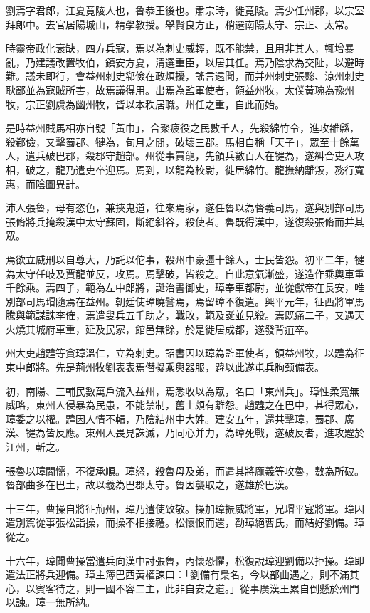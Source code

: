 
\begin{pinyinscope}
劉焉字君郎，江夏竟陵人也，魯恭王後也。肅宗時，徙竟陵。焉少任州郡，以宗室拜郎中。去官居陽城山，精學教授。舉賢良方正，稍遷南陽太守、宗正、太常。

時靈帝政化衰缺，四方兵寇，焉以為刺史威輕，既不能禁，且用非其人，輒增暴亂，乃建議改置牧伯，鎮安方夏，清選重臣，以居其任。焉乃陰求為交阯，以避時難。議未即行，會益州刺史郗儉在政煩擾，謠言遠聞，而并州刺史張懿、涼州刺史耿鄙並為寇賊所害，故焉議得用。出焉為監軍使者，領益州牧，太僕黃琬為豫州牧，宗正劉虞為幽州牧，皆以本秩居職。州任之重，自此而始。

是時益州賊馬相亦自號「黃巾」，合聚疲役之民數千人，先殺綿竹令，進攻雒縣，殺郗儉，又擊蜀郡、犍為，旬月之閒，破壞三郡。馬相自稱「天子」，眾至十餘萬人，遣兵破巴郡，殺郡守趙部。州從事賈龍，先領兵數百人在犍為，遂糾合吏人攻相，破之，龍乃遣吏卒迎焉。焉到，以龍為校尉，徙居綿竹。龍撫納離叛，務行寬惠，而陰圖異計。

沛人張魯，母有恣色，兼挾鬼道，往來焉家，遂任魯以為督義司馬，遂與別部司馬張脩將兵掩殺漢中太守蘇固，斷絕斜谷，殺使者。魯既得漢中，遂復殺張脩而并其眾。

焉欲立威刑以自尊大，乃託以佗事，殺州中豪彊十餘人，士民皆怨。初平二年，犍為太守任岐及賈龍並反，攻焉。焉擊破，皆殺之。自此意氣漸盛，遂造作乘輿車重千餘乘。焉四子，範為左中郎將，誕治書御史，璋奉車都尉，並從獻帝在長安，唯別部司馬瑁隨焉在益州。朝廷使璋曉譬焉，焉留璋不復遣。興平元年，征西將軍馬騰與範謀誅李傕，焉遣叟兵五千助之，戰敗，範及誕並見殺。焉既痛二子，又遇天火燒其城府車重，延及民家，館邑無餘，於是徙居成都，遂發背疽卒。

州大吏趙韙等貪璋溫仁，立為刺史。詔書因以璋為監軍使者，領益州牧，以韙為征東中郎將。先是荊州牧劉表表焉僭擬乘輿器服，韙以此遂屯兵朐颈備表。

初，南陽、三輔民數萬戶流入益州，焉悉收以為眾，名曰「東州兵」。璋性柔寬無威略，東州人侵暴為民患，不能禁制，舊士頗有離怨。趙韙之在巴中，甚得眾心，璋委之以權。韙因人情不輯，乃陰結州中大姓。建安五年，還共擊璋，蜀郡、廣漢、犍為皆反應。東州人畏見誅滅，乃同心并力，為璋死戰，遂破反者，進攻韙於江州，斬之。

張魯以璋闇懦，不復承順。璋怒，殺魯母及弟，而遣其將龐羲等攻魯，數為所破。魯部曲多在巴土，故以羲為巴郡太守。魯因襲取之，遂雄於巴漢。

十三年，曹操自將征荊州，璋乃遣使致敬。操加璋振威將軍，兄瑁平寇將軍。璋因遣別駕從事張松詣操，而操不相接禮。松懷恨而還，勸璋絕曹氏，而結好劉備。璋從之。

十六年，璋聞曹操當遣兵向漢中討張魯，內懷恐懼，松復說璋迎劉備以拒操。璋即遣法正將兵迎備。璋主簿巴西黃權諫曰：「劉備有梟名，今以部曲遇之，則不滿其心，以賓客待之，則一國不容二主，此非自安之道。」從事廣漢王累自倒懸於州門以諫。璋一無所納。


\end{pinyinscope}
